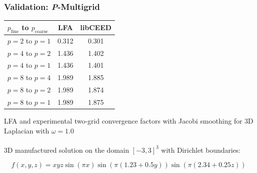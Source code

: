 \documentclass{beamer}
\begin{document}
\begin{frame}
\begin{center}
\frametitle{Validation: {\textit P}-Multigrid}

\begin{table}[ht!]
\begin{center}
\begin{tabular}{l c c}
  \toprule
  $p_{\text{fine}}$ to $p_{\text{coarse}}$  &  LFA  &  libCEED  \\
  \toprule
  $p = 2$ to $p = 1$   &  0.312  &  0.301  \\
  \midrule
  $p = 4$ to $p = 2$   &  1.436  &  1.402  \\
  $p = 4$ to $p = 1$   &  1.436  &  1.401  \\
  \midrule
  $p = 8$ to $p = 4$   &  1.989  &  1.885  \\
  $p = 8$ to $p = 2$   &  1.989  &  1.874  \\
  $p = 8$ to $p = 1$   &  1.989  &  1.875  \\
  \bottomrule
\end{tabular}
\end{center}
\label{table:two_grid_3d_jacobi}
\end{table}
{\small LFA and experimental two-grid convergence factors with Jacobi smoothing for 3D Laplacian with $\omega = 1.0$}\\

~\\

3D manufactured solution on the domain $\left[ -3, 3 \right]^3$ with Dirichlet boundaries:

\begin{equation}
f \left( x, y, z \right) = x y z \sin \left( \pi x \right) \sin \left( \pi \left( 1.23 + 0.5 y \right) \right) \sin \left( \pi \left( 2.34 + 0.25 z \right) \right)
\end{equation}

\end{center}
\end{frame}

\end{document}
